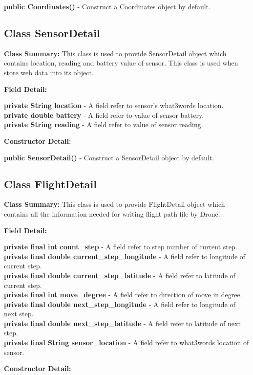 \documentclass[12pt]{article}
\begin{document}
\textbf{public Coordinates()} - Construct a Coordinates object by default.

\subsection {Class SensorDetail}
\textbf{Class Summary:} This class is used to provide SensorDetail object which contains location, reading and battery value of sensor. This class is used when store web data into its object.

\textbf{Field Detail:}

\textbf{private String location} - A field refer to sensor's what3words location.\\
\textbf{private double battery} - A field refer to value of sensor battery.\\
\textbf{private String reading} - A field refer to value of sensor reading.

\textbf{Constructor Detail:}

\textbf{public SensorDetail()} - Construct a SensorDetail object by default.

\subsection {Class FlightDetail}
\textbf{Class Summary:} This class is used to provide FlightDetail object which contains all the information needed for writing flight path file by Drone.

\textbf{Field Detail:}

\textbf{private final int count\_step} - A field refer to step number of current step.\\
\textbf{private final double current\_step\_longitude} - A field refer to longitude of current step.\\
\textbf{private final double current\_step\_latitude} - A field refer to latitude of current step.\\
\textbf{private final int move\_degree} - A field refer to direction of move in degree.\\
\textbf{private final double next\_step\_longitude} - A field refer to longitude of next step.\\
\textbf{private final double next\_step\_latitude} - A field refer to latitude of next step.\\
\textbf{private final String sensor\_location} - A field refer to what3words location of sensor.

\textbf{Constructor Detail:}
\end{document}
